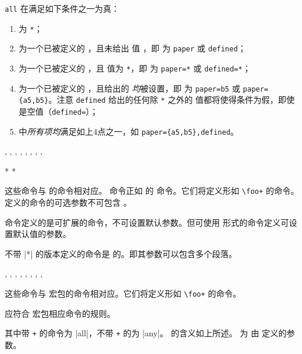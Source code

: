 \documentclass{ctxdoc}
\begin{document}
\verb|all| 在满足如下条件之一为真：
\begin{enumerate}
    \item {} 为 \verb|*|；
    \item {} 为一个已被定义的 ，且未给出  值 ，即  为 \verb|paper| 或 \verb|defined|；
    \item {} 为一个已被定义的 ，且  值为 \verb|*|，即  为 \verb|paper=*| 或 \verb|defined=*|；
    \item {} 为一个已被定义的 ，且给出的  \emph{均}被设置，即  为 \verb|paper=b5| 或 \verb|paper={a5,b5}|。注意 \verb|defined| 给出的任何除 \verb|*| 之外的  值都将使得条件为假，即使是空值（\verb|defined=|）；
    \item {} 中\emph{所有项均}满足如上4点之一，如 \verb|paper={a5,b5},defined|。
\end{enumerate}

\begin{function}{
	\newconditioncommand,
	\renewconditioncommand,
	\provideconditioncommand,
	\declareconditioncommand,
	\neweconditioncommand,
	\reneweconditioncommand,
	\provideeconditioncommand,
	\declareeconditioncommand,
}
	\begin{syntax}
		 *    
		 *   
	\end{syntax}
	这些命令与 \LaTeXe{} 的命令相对应。 命令正如 \LaTeXe{} 的  命令。它们将定义形如 \verb|\foo+| 的命令。定义的命令的可选参数不可包含 \tn{par}。

	 命令定义的是可扩展的命令，不可设置默认参数。但可使用  形式的命令定义可设置默认值的参数。
	
	不带 |*| 的版本定义的命令是  的。即其参数可以包含多个段落。
\end{function}

\begin{function}{
    \NewConditionCommand ,
    \RenewConditionCommand ,
    \ProvideConditionCommand ,
    \DeclareConditionCommand ,
    \NewExpandableConditionCommand ,
    \RenewExpandableConditionCommand ,
    \ProvideExpandableConditionCommand ,
    \DeclareExpandableConditionCommand ,
}
	\begin{syntax}
		   \marg{code}
	\end{syntax}
	这些命令与  宏包的命令相对应。它们将定义形如 \verb|\foo+| 的命令。

	 应符合  宏包相应命令的规则。

	其中带 \verb|+| 的命令为 |all|，不带 \verb|+| 的为 |any|。 的含义如上所述。 为
	由  定义的参数。
\end{function}
\end{document}
